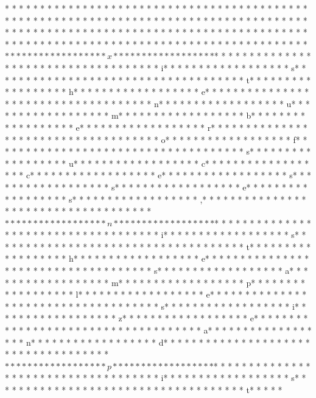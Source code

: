 * * *  * * *  * * *  *  * * *  *  * * *  * * *  * * *  *  * * *  *  * * *  * * *  * * *  *  * * *  *  * * *  *  * * *  * * *  * * *  *  * * *  *  * * *  *  * * *  * * *  * * *  *  * * *  *  * * *  *  * * *  * * *  * * *  *  * * *  *  * * *  *  * * *  * * *  * * *  *  * * *  *  * * *  *  * * *  * * *  * * *  *  * * *  *  * * *  *  * * *  * * *  * * *  *  * * *  *  * * *  *  * * *  * * *  * * *  *  * * *  *  * * *  * $* * *  * * *  * * *  *  * * *  *  * * *  * x* * *  * * *  * * *  *  * * *  *  * * *  * $* * *  * * *  * * *  *  * * *  *  * * *  *  * * *  * * *  * * *  *  * * *  *  * * *  * i* * *  * * *  * * *  *  * * *  *  * * *  * s* * *  * * *  * * *  *  * * *  *  * * *  *  * * *  * * *  * * *  *  * * *  *  * * *  * t* * *  * * *  * * *  *  * * *  *  * * *  * h* * *  * * *  * * *  *  * * *  *  * * *  * e* * *  * * *  * * *  *  * * *  *  * * *  *  * * *  * * *  * * *  *  * * *  *  * * *  * n* * *  * * *  * * *  *  * * *  *  * * *  * u* * *  * * *  * * *  *  * * *  *  * * *  * m* * *  * * *  * * *  *  * * *  *  * * *  * b* * *  * * *  * * *  *  * * *  *  * * *  * e* * *  * * *  * * *  *  * * *  *  * * *  * r* * *  * * *  * * *  *  * * *  *  * * *  *  * * *  * * *  * * *  *  * * *  *  * * *  * o* * *  * * *  * * *  *  * * *  *  * * *  * f* * *  * * *  * * *  *  * * *  *  * * *  *  * * *  * * *  * * *  *  * * *  *  * * *  * s* * *  * * *  * * *  *  * * *  *  * * *  * u* * *  * * *  * * *  *  * * *  *  * * *  * c* * *  * * *  * * *  *  * * *  *  * * *  * c* * *  * * *  * * *  *  * * *  *  * * *  * e* * *  * * *  * * *  *  * * *  *  * * *  * s* * *  * * *  * * *  *  * * *  *  * * *  * s* * *  * * *  * * *  *  * * *  *  * * *  * e* * *  * * *  * * *  *  * * *  *  * * *  * s* * *  * * *  * * *  *  * * *  *  * * *  * ,* * *  * * *  * * *  *  * * *  *  * * *  *  * * *  * * *  * * *  *  * * *  *  * * *  * $* * *  * * *  * * *  *  * * *  *  * * *  * n* * *  * * *  * * *  *  * * *  *  * * *  * $* * *  * * *  * * *  *  * * *  *  * * *  *  * * *  * * *  * * *  *  * * *  *  * * *  * i* * *  * * *  * * *  *  * * *  *  * * *  * s* * *  * * *  * * *  *  * * *  *  * * *  *  * * *  * * *  * * *  *  * * *  *  * * *  * t* * *  * * *  * * *  *  * * *  *  * * *  * h* * *  * * *  * * *  *  * * *  *  * * *  * e* * *  * * *  * * *  *  * * *  *  * * *  *  * * *  * * *  * * *  *  * * *  *  * * *  * s* * *  * * *  * * *  *  * * *  *  * * *  * a* * *  * * *  * * *  *  * * *  *  * * *  * m* * *  * * *  * * *  *  * * *  *  * * *  * p* * *  * * *  * * *  *  * * *  *  * * *  * l* * *  * * *  * * *  *  * * *  *  * * *  * e* * *  * * *  * * *  *  * * *  *  * * *  *  * * *  * * *  * * *  *  * * *  *  * * *  * s* * *  * * *  * * *  *  * * *  *  * * *  * i* * *  * * *  * * *  *  * * *  *  * * *  * z* * *  * * *  * * *  *  * * *  *  * * *  * e* * *  * * *  * * *  *  * * *  *  * * *  *  * * *  * * *  * * *  *  * * *  *  * * *  * a* * *  * * *  * * *  *  * * *  *  * * *  * n* * *  * * *  * * *  *  * * *  *  * * *  * d* * *  * * *  * * *  *  * * *  *  * * *  *  * * *  * * *  * * *  *  * * *  *  * * *  * $* * *  * * *  * * *  *  * * *  *  * * *  * p* * *  * * *  * * *  *  * * *  *  * * *  * $* * *  * * *  * * *  *  * * *  *  * * *  *  * * *  * * *  * * *  *  * * *  *  * * *  * i* * *  * * *  * * *  *  * * *  *  * * *  * s* * *  * * *  * * *  *  * * *  *  * * *  *  * * *  * * *  * * *  *  * * *  *  * * *  * t* * *  * * 